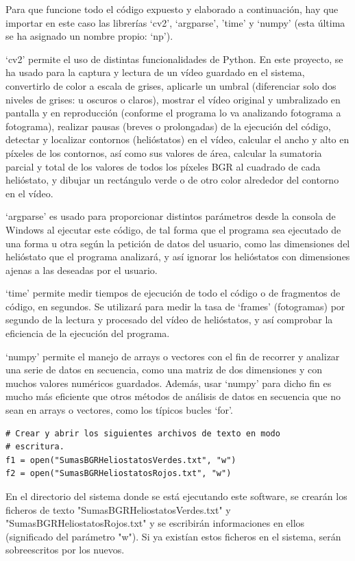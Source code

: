 Para que funcione todo el código expuesto y elaborado a continuación, hay que importar en este caso las librerías ‘cv2’, ‘argparse’, 'time' y ‘numpy’ (esta última se ha asignado un nombre propio: ‘np’).

‘cv2’ permite el uso de distintas funcionalidades de Python. En este proyecto, se ha usado para la captura y lectura de un vídeo guardado en el sistema, convertirlo de color a escala de grises, aplicarle un umbral (diferenciar solo dos niveles de grises: u oscuros o claros), mostrar el vídeo original y umbralizado en pantalla y en reproducción (conforme el programa lo va analizando fotograma a fotograma), realizar pausas (breves o prolongadas) de la ejecución del código, detectar y localizar contornos (helióstatos) en el vídeo, calcular el ancho y alto en píxeles de los contornos, así como sus valores de área, calcular la sumatoria parcial y total de los valores de todos los píxeles BGR al cuadrado de cada helióstato, y dibujar un rectángulo verde o de otro color alrededor del contorno en el vídeo.

‘argparse’ es usado para proporcionar distintos parámetros desde la consola de Windows al ejecutar este código, de tal forma que el programa sea ejecutado de una forma u otra según la petición de datos del usuario, como las dimensiones del helióstato que el programa analizará, y así ignorar los helióstatos con dimensiones ajenas a las deseadas por el usuario.

‘time’ permite medir tiempos de ejecución de todo el código o de fragmentos de código, en segundos. Se utilizará para medir la tasa de ‘frames’ (fotogramas) por segundo de la lectura y procesado del vídeo de helióstatos, y así comprobar la eficiencia de la ejecución del programa.

‘numpy’ permite el manejo de arrays o vectores con el fin de recorrer y analizar una serie de datos en secuencia, como una matriz de dos dimensiones y con muchos valores numéricos guardados. Además, usar ‘numpy’ para dicho fin es mucho más eficiente que otros métodos de análisis de datos en secuencia que no sean en arrays o vectores, como los típicos bucles ‘for’.\\[20pt]

\begin{lstlisting}
# Crear y abrir los siguientes archivos de texto en modo
# escritura.
f1 = open("SumasBGRHeliostatosVerdes.txt", "w")
f2 = open("SumasBGRHeliostatosRojos.txt", "w")
\end{lstlisting}

En el directorio del sistema donde se está ejecutando este software, se crearán los ficheros de texto "SumasBGRHeliostatosVerdes.txt" y "SumasBGRHeliostatosRojos.txt" y se escribirán informaciones en ellos (significado del parámetro "w"). Si ya existían estos ficheros en el sistema, serán sobreescritos por los nuevos.\\[20pt]

